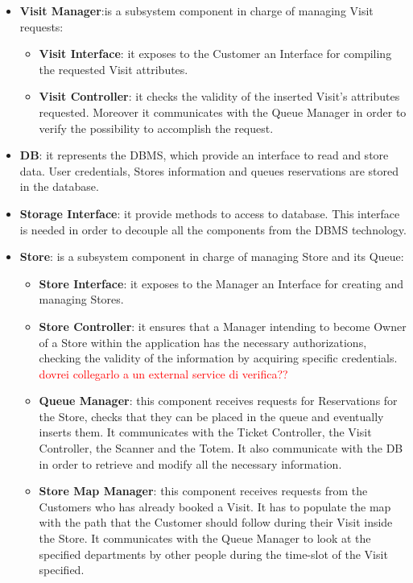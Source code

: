 \documentclass[a4paper, 12pt, oneside, table]{article}
\newcommand{\yasmin}[1]{\textcolor{Red}{#1}}
\begin{document}
\begin{itemize}
\begin{itemize}
    \end{itemize}
    \item \textbf{Visit Manager}:is a subsystem component in charge of managing Visit requests:
    \begin{itemize}
        \item \textbf{Visit Interface}: it exposes to the Customer an Interface for compiling the requested Visit attributes.
        \item \textbf{Visit Controller}: it checks the validity of the inserted Visit's attributes requested. Moreover it communicates with the Queue Manager in order to verify the possibility to accomplish the request.
    \end{itemize}
    \item \textbf{DB}: it represents the DBMS, which provide an interface to read and store data. User credentials, Stores information and queues reservations are stored  in the database.
    \item \textbf{Storage Interface}: it provide methods to access to database. This interface is needed in order to decouple all the components from the DBMS technology.
    \item \textbf{Store}: is a subsystem component in charge of managing Store and its Queue:
    \begin{itemize}
        \item \textbf{Store Interface}: it exposes to the Manager an Interface for creating and managing Stores.
        \item \textbf{Store Controller}: it ensures that a Manager intending to become Owner of a Store within the application has the necessary authorizations, checking the validity of the information by acquiring specific credentials. \yasmin{dovrei collegarlo a un external service di verifica??}
        \item \textbf{Queue Manager}: this component receives requests for Reservations for the Store, checks that they can be placed in the queue and eventually inserts them. It communicates with the Ticket Controller, the Visit Controller, the Scanner and the Totem. It also communicate with the DB in order to retrieve and modify all the necessary information.
        \item \label{comp:storeMapMan} \textbf{Store Map Manager}: this component receives requests from the Customers who has already booked a Visit. It has to populate the map with the path that the Customer should follow during their Visit inside the Store. It communicates with the Queue Manager to look at the specified departments by other people during the time-slot of the Visit specified.

\end{itemize}
\end{itemize}
\end{document}
